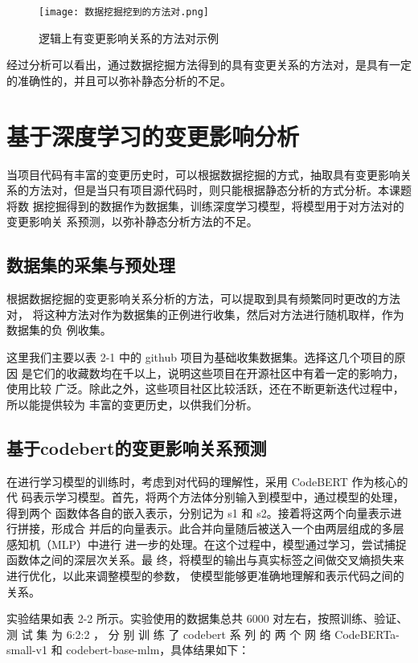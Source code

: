 \begin{figure}[h]
\centering
\texttt{[image: 数据挖掘挖到的方法对.png]}
\caption{逻辑上有变更影响关系的方法对示例}
\end{figure}


经过分析可以看出，通过数据挖掘方法得到的具有变更关系的方法对，是具有一定
的准确性的，并且可以弥补静态分析的不足。

\section{基于深度学习的变更影响分析}

当项目代码有丰富的变更历史时，可以根据数据挖掘的方式，抽取具有变更影响关
系的方法对，但是当只有项目源代码时，则只能根据静态分析的方式分析。本课题将数
据挖掘得到的数据作为数据集，训练深度学习模型，将模型用于对方法对的变更影响关
系预测，以弥补静态分析方法的不足。

\subsection{数据集的采集与预处理}

根据数据挖掘的变更影响关系分析的方法，可以提取到具有频繁同时更改的方法对，
将这种方法对作为数据集的正例进行收集，然后对方法进行随机取样，作为数据集的负
例收集。

这里我们主要以表 2-1 中的 github 项目为基础收集数据集。选择这几个项目的原因
是它们的收藏数均在千以上，说明这些项目在开源社区中有着一定的影响力，使用比较
广泛。除此之外，这些项目社区比较活跃，还在不断更新迭代过程中，所以能提供较为
丰富的变更历史，以供我们分析。

\subsection{基于codebert的变更影响关系预测}

在进行学习模型的训练时，考虑到对代码的理解性，采用 CodeBERT 作为核心的代
码表示学习模型。首先，将两个方法体分别输入到模型中，通过模型的处理，得到两个
函数体各自的嵌入表示，分别记为 s1 和 s2。接着将这两个向量表示进行拼接，形成合
并后的向量表示。此合并向量随后被送入一个由两层组成的多层感知机（MLP）中进行
进一步的处理。在这个过程中，模型通过学习，尝试捕捉函数体之间的深层次关系。最
终，将模型的输出与真实标签之间做交叉熵损失来进行优化，以此来调整模型的参数，
使模型能够更准确地理解和表示代码之间的关系。

实验结果如表 2-2 所示。实验使用的数据集总共 6000 对左右，按照训练、验证、测
试 集 为 6:2:2 ， 分 别 训 练 了 codebert 系 列 的 两 个 网 络 CodeBERTa-small-v1 和
codebert-base-mlm，具体结果如下：

